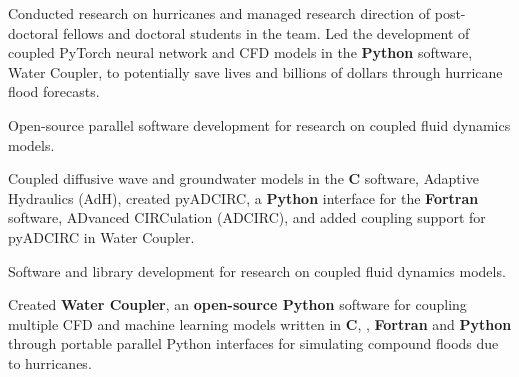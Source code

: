 \documentclass[letterpaper,10pt]{article}
\begin{document}
 
        \resumeItemListStart
            {Conducted research on hurricanes and managed research direction
            of post-doctoral fellows and doctoral students in the team.}
            {Led the development of coupled PyTorch neural network and CFD
            models in the \textbf{Python} software, Water Coupler, to
            potentially save lives and billions of dollars through hurricane
            flood forecasts.}
        \resumeItemListEnd

 
        \resumeItemListStart
            {Open-source parallel software development for research on coupled
            fluid dynamics models.}

            {Coupled diffusive wave and groundwater models in the \textbf{C}
            software, Adaptive Hydraulics (AdH), created pyADCIRC, a
            \textbf{Python} interface for the \textbf{Fortran} software,
            ADvanced CIRCulation (ADCIRC), and added coupling support for
            pyADCIRC in Water Coupler.}
        \resumeItemListEnd

 
        \resumeItemListStart
            {Software and library development for research on coupled
            fluid dynamics models.}

            {Created \textbf{Water Coupler}, an \textbf{open-source Python}
            software for coupling multiple CFD and machine learning models
            written in \textbf{C}, \textbf{\CC{}}, \textbf{Fortran} and
            \textbf{Python} through portable parallel Python interfaces for
            simulating compound floods due to hurricanes.}
       \resumeItemListEnd
\end{document}

